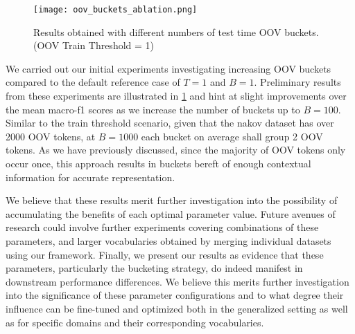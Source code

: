 \documentclass[../../fyp.tex]{subfiles}
\begin{document}
\begin{figure}[!ht]
	\centering
	\texttt{[image: oov\_buckets\_ablation.png]}
	\caption{Results obtained with different numbers of test time OOV buckets. (OOV Train Threshold = 1)}
	\label{fig:oov_threshold_ablation}
\end{figure}

We carried out our initial experiments investigating increasing OOV buckets compared to the default reference case of $T=1$ and $B=1$. Preliminary results from these experiments are illustrated in \ref{fig:oov_threshold_ablation} and hint at slight improvements over the mean macro-f1 scores as we increase the number of buckets up to $B=100$. Similar to the train threshold scenario, given that the nakov dataset has over 2000 OOV tokens, at $B=1000$ each bucket on average shall group 2 OOV tokens. As we have previously discussed, since the majority of OOV tokens only occur once, this approach results in buckets bereft of enough contextual information for accurate representation. 

We believe that these results merit further investigation into the possibility of accumulating the benefits of each optimal parameter value. Future avenues of research could involve further experiments covering combinations of these parameters, and larger vocabularies obtained by merging individual datasets using our framework. Finally, we present our results as evidence that these parameters, particularly the bucketing strategy, do indeed manifest in downstream performance differences. We believe this merits further investigation into the significance of these parameter configurations and to what degree their influence can be fine-tuned and optimized both in the generalized setting as well as for specific domains and their corresponding vocabularies.
\end{document}
